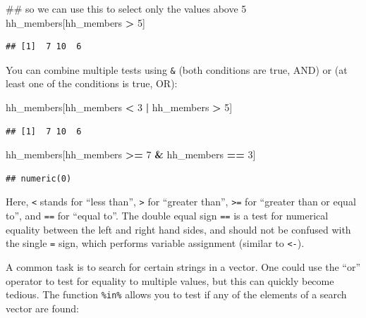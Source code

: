 \documentclass[]{book}
\newenvironment{Shaded}{\begin{snugshade}}{\end{snugshade}}
\newcommand{\DecValTok}[1]{\textcolor[rgb]{0.00,0.00,0.81}{#1}}
\newcommand{\StringTok}[1]{\textcolor[rgb]{0.31,0.60,0.02}{#1}}
\newcommand{\OperatorTok}[1]{\textcolor[rgb]{0.81,0.36,0.00}{\textbf{#1}}}
\newcommand{\NormalTok}[1]{#1}
\begin{document}
\begin{Shaded}
\begin{Highlighting}[]
\NormalTok{## so we can use this to select only the values above 5}
\NormalTok{hh_members[hh_members }\OperatorTok{>}\StringTok{ }\DecValTok{5}\NormalTok{]}
\end{Highlighting}
\end{Shaded}

\begin{verbatim}
## [1]  7 10  6
\end{verbatim}

You can combine multiple tests using \texttt{\&} (both conditions are
true, AND) or \texttt{\textbar{}} (at least one of the conditions is
true, OR):

\begin{Shaded}
\begin{Highlighting}[]
\NormalTok{hh_members[hh_members }\OperatorTok{<}\StringTok{ }\DecValTok{3} \OperatorTok{|}\StringTok{ }\NormalTok{hh_members }\OperatorTok{>}\StringTok{ }\DecValTok{5}\NormalTok{]}
\end{Highlighting}
\end{Shaded}

\begin{verbatim}
## [1]  7 10  6
\end{verbatim}

\begin{Shaded}
\begin{Highlighting}[]
\NormalTok{hh_members[hh_members }\OperatorTok{>=}\StringTok{ }\DecValTok{7} \OperatorTok{&}\StringTok{ }\NormalTok{hh_members }\OperatorTok{==}\StringTok{ }\DecValTok{3}\NormalTok{]}
\end{Highlighting}
\end{Shaded}

\begin{verbatim}
## numeric(0)
\end{verbatim}

Here, \texttt{\textless{}} stands for ``less than'',
\texttt{\textgreater{}} for ``greater than'', \texttt{\textgreater{}=}
for ``greater than or equal to'', and \texttt{==} for ``equal to''. The
double equal sign \texttt{==} is a test for numerical equality between
the left and right hand sides, and should not be confused with the
single \texttt{=} sign, which performs variable assignment (similar to
\texttt{\textless{}-}).

A common task is to search for certain strings in a vector. One could
use the ``or'' operator \texttt{\textbar{}} to test for equality to
multiple values, but this can quickly become tedious. The function
\texttt{\%in\%} allows you to test if any of the elements of a search
vector are found:
\end{document}
